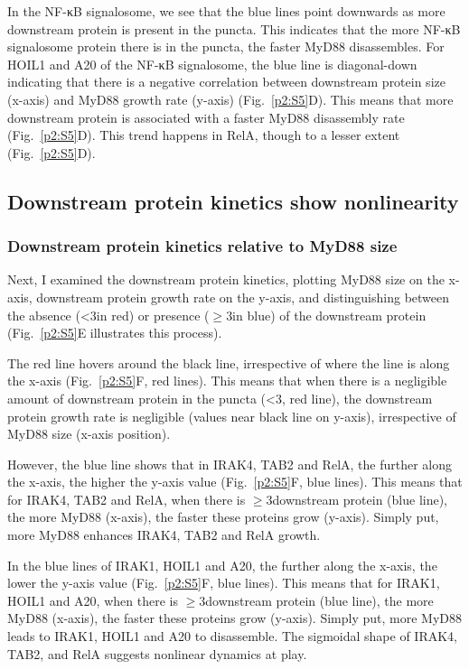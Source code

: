 In the NF-κB signalosome, we see that the blue lines point downwards as more downstream protein is present in the puncta. This indicates that the more NF-κB signalosome protein there is in the puncta, the faster MyD88 disassembles. For HOIL1 and A20 of the NF-κB signalosome, the blue line is diagonal-down indicating that there is a negative correlation between downstream protein size (x-axis) and MyD88 growth rate (y-axis) (Fig.~\ref{p2:S5}D). This means that more downstream protein is associated with a faster MyD88 disassembly rate (Fig.~\ref{p2:S5}D). This trend happens in RelA, though to a lesser extent (Fig.~\ref{p2:S5}D).

\subsection{Downstream protein kinetics show nonlinearity}
\subsubsection{Downstream protein kinetics relative to MyD88 size}
Next, I examined the downstream protein kinetics, plotting MyD88 size on the x-axis, downstream protein growth rate on the y-axis, and distinguishing between the absence (<3\times in red) or presence ($\geq$3\times in blue) of the downstream protein (Fig.~\ref{p2:S5}E illustrates this process).

The red line hovers around the black line, irrespective of where the line is along the x-axis (Fig.~\ref{p2:S5}F, red lines). This means that when there is a negligible amount of downstream protein in the puncta (<3\times, red line), the downstream protein growth rate is negligible (values near black line on y-axis), irrespective of MyD88 size (x-axis position).

However, the blue line shows that in IRAK4, TAB2 and RelA, the further along the x-axis, the higher the y-axis value (Fig.~\ref{p2:S5}F, blue lines). This means that for IRAK4, TAB2 and RelA, when there is $\geq$3\times downstream protein (blue line), the more MyD88 (x-axis), the faster these proteins grow (y-axis). Simply put, more MyD88 enhances IRAK4, TAB2 and RelA growth.

In the blue lines of IRAK1, HOIL1 and A20, the further along the x-axis, the lower the y-axis value (Fig.~\ref{p2:S5}F, blue lines). This means that for IRAK1, HOIL1 and A20, when there is $\geq$3\times downstream protein (blue line), the more MyD88 (x-axis), the faster these proteins grow (y-axis). Simply put, more MyD88 leads to IRAK1, HOIL1 and A20 to disassemble. The sigmoidal shape of IRAK4, TAB2, and RelA suggests nonlinear dynamics at play.

